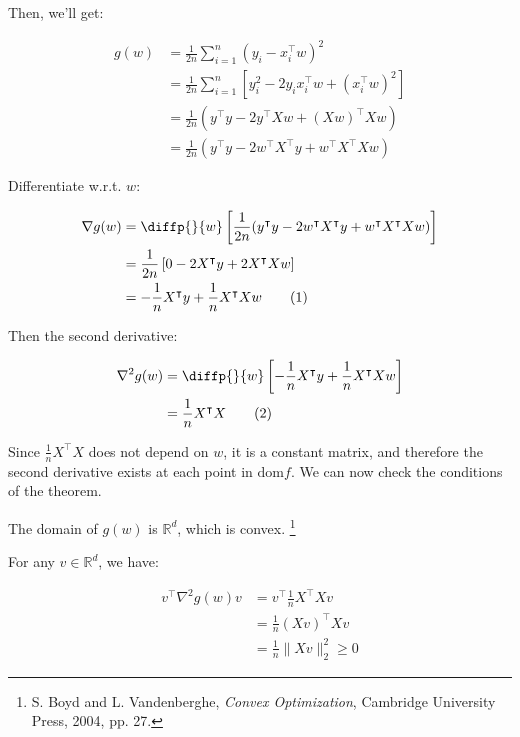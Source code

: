 \documentclass{article}
\begin{document}
Then, we'll get:

\begin{equation*}
    \begin{split}
    g(w) 
        &= \frac{1}{2n} \sum_{i = 1}^n ( y_i - x_i^\intercal  w)^2 \\
        &= \frac{1}{2n} \sum_{i = 1}^n\left[y_i^2 - 2y_ix_i^\intercal w + (x_i^\intercal w)^2 \right]\\
        &= \frac{1}{2n} (y^\intercal y - 2y^\intercal Xw + (Xw)^\intercal Xw)\\
        &= \frac{1}{2n} (y^\intercal y - 2w^\intercal X^\intercal y + w^\intercal X^\intercal Xw)
    \end{split}
\end{equation*}

Differentiate w.r.t. $w$:

\begin{align*}
    \nabla g(w) 
        &= \diffp{}{w} \left[\frac{1}{2n} (y^\intercal y - 2w^\intercal X^\intercal y + w^\intercal X^\intercal Xw) \right]\\
        &= \frac{1}{2n} \left[0 - 2X^\intercal y + 2X^\intercal Xw\right] \\
        &= - \frac{1}{n} X^\intercal y + \frac{1}{n} X^\intercal Xw \tag{1}
\end{align*} 

Then the second derivative:

\begin{align*}
    \nabla^2 g(w) 
        &= \diffp{}{w} \left[- \frac{1}{n} X^\intercal y + \frac{1}{n} X^\intercal Xw \right]\\
        &= \frac{1}{n} X^\intercal X \tag{2}
\end{align*}

Since $\frac{1}{n} X^\intercal X$ does not depend on $w$, it is a constant matrix, 
and therefore the second derivative exists at each point in $\mathrm{dom} f$.
We can now check the conditions of the theorem.
\bigskip

The domain of $g(w)$ is $\mathbb{R}^d$, which is convex.
\footnote{S. Boyd and L. Vandenberghe, \textit{Convex Optimization}, Cambridge University Press, 2004, pp. 27.}
\bigskip

For any $v \in \mathbb{R}^d$, we have:

\begin{equation*}
    \begin{split}
        v^\intercal  \nabla^2 g(w) v 
            &= v^\intercal  \frac{1}{n} X^\intercal X v \\
            &= \frac{1}{n} (Xv)^\intercal  Xv \\
            &= \frac{1}{n} \|Xv\|_2^2 \ge 0
    \end{split}
\end{equation*}
\end{document}
